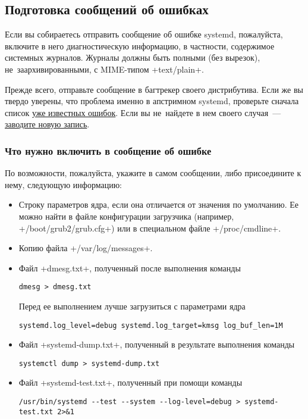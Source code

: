 \documentclass[10pt,oneside,a4paper]{article}
\begin{document}
\subsection{Подготовка сообщений об ошибках}

Если вы собираетесь отправить сообщение об ошибке systemd, пожалуйста,
включите в него диагностическую информацию, в частности, содержимое системных
журналов. Журналы должны быть полными (без вырезок), не~заархивированными, с
MIME-типом +text/plain+.

Прежде всего, отправьте сообщение в багтрекер своего дистрибутива. Если же вы
твердо уверены, что проблема именно в апстримном systemd, проверьте сначала
список
\href{https://bugs.freedesktop.org/buglist.cgi?query_format=advanced&bug_status=NEW&bug_status=ASSIGNED&bug_status=REOPENED&product=systemd}{уже
известных ошибок}. Если вы не~найдете в нем своего случая~---
\href{https://bugs.freedesktop.org/enter_bug.cgi?product=systemd}{заводите новую
запись}.

\subsubsection{Что нужно включить в сообщение об ошибке}

По возможности, пожалуйста, укажите в самом сообщении, либо присоедините к нему,
следующую информацию:
\begin{itemize}
	\item Строку параметров ядра, если она отличается от значения по
		умолчанию. Ее можно найти в файле конфигурации загрузчика
		(например, +/boot/grub2/grub.cfg+) или в специальном файле
		+/proc/cmdline+.
	\item Копию файла +/var/log/messages+.
	\item Файл +dmesg.txt+, полученный после выполнения команды
\begin{Verbatim}		
dmesg > dmesg.txt
\end{Verbatim}
		Перед ее выполнением лучше загрузиться с параметрами ядра
\begin{Verbatim}
systemd.log_level=debug systemd.log_target=kmsg log_buf_len=1M
\end{Verbatim}
	\item Файл +systemd-dump.txt+, полученный в результате выполнения
		команды 
\begin{Verbatim}
systemctl dump > systemd-dump.txt
\end{Verbatim}
	\item Файл +systemd-test.txt+, полученный при помощи команды
\begin{Verbatim}
/usr/bin/systemd --test --system --log-level=debug > systemd-test.txt 2>&1
\end{Verbatim}
\end{itemize}
\end{document}
